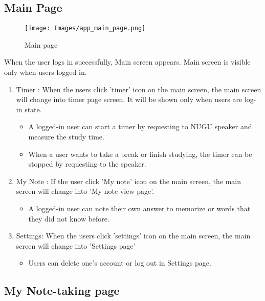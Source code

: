 \documentclass[conference]{IEEEtran}
\begin{document}
\subsection{Main Page}

\begin{figure}[htp]
    \centering
    \texttt{[image: Images/app\_main\_page.png]}
    \caption{Main page}
\end{figure}

When the user logs in successfully, Main screen appears. Main screen is visible only when users logged in.

\begin{enumerate}
    \item Timer : When the users click 'timer' icon on the main screen, the main screen will change into timer page screen. It will be shown only when users are log-in state.
    
    \begin{itemize}
        \item A logged-in user can start a timer by requesting to NUGU speaker and measure the study time.
        \item When a user wants to take a break or finish studying, the timer can be stopped by requesting to the speaker.
    \end{itemize}
    
    \item My Note : If the user click 'My note' icon on the main screen, the main screen will change into 'My note view page’.
    
    \begin{itemize}
        \item A logged-in user can note their own answer to memorize or words that they did not know before.
    \end{itemize}
    
    \item Settings: When the users click 'settings' icon on the main screen, the main screen will change into 'Settings page'
    
    \begin{itemize}
        \item Users can delete one's account or log out in Settings page.
    \end{itemize}
    
\end{enumerate}


\subsection{My Note-taking page}
\end{document}
